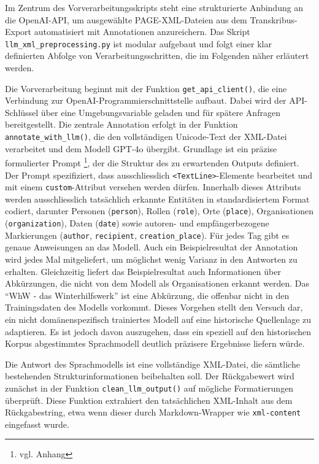 \documentclass[12pt, a4paper, ngerman, bidi=default]{article}
\newcommand{\code}[1]{\colorbox{VeryLightGray}{\texttt{#1}}} %
\begin{document}
Im Zentrum des Vorverarbeitungsskripts steht eine strukturierte Anbindung an die OpenAI-API, um ausgewählte 
PAGE-XML-Dateien aus dem Transkribus-Export automatisiert mit Annotationen anzureichern. Das Skript \code{llm\_xml\_preprocessing.py} ist modular
aufgebaut und folgt einer klar definierten Abfolge von Verarbeitungsschritten, die im Folgenden näher erläutert werden.

Die Vorverarbeitung beginnt mit der Funktion \code{get\_api\_client()}, die eine Verbindung zur OpenAI-Programmierschnittstelle 
aufbaut. Dabei wird der API-Schlüssel über eine Umgebungsvariable geladen und für spätere Anfragen bereitgestellt.
Die zentrale Annotation erfolgt in der Funktion \code{annotate\_with\_llm()}, die den vollständigen Unicode-Text der XML-Datei
verarbeitet und dem Modell GPT-4o übergibt. Grundlage ist ein präzise formulierter Prompt \footnote{vgl. Anhang }, der die Struktur des zu erwartenden
Outputs definiert. Der Prompt spezifiziert, dass ausschliesslich \code{<TextLine>}-Elemente bearbeitet und mit einem \code{custom}-Attribut
versehen werden dürfen. Innerhalb dieses Attributs werden ausschliesslich tatsächlich erkannte Entitäten in standardisiertem Format codiert, 
darunter Personen (\code{person}), Rollen (\code{role}), Orte (\code{place}), Organisationen (\code{organization}), Daten (\code{date}) 
sowie autoren- und empfängerbezogene Markierungen (\code{author}, \code{recipient}, \code{creation\_place}). Für jedes Tag gibt es genaue Anweisungen
an das Modell. Auch ein Beispielresultat der Annotation wird jedes Mal mitgeliefert, um möglichst wenig Varianz in den Antworten zu erhalten. Gleichzeitig liefert
das Beispielresultat auch Informationen über Abkürzungen, die nicht von dem Modell als Organisationen erkannt werden. Das \enquote{WhW - das Winterhilfswerk} ist eine
Abkürzung, die offenbar nicht in den Trainingsdaten des Modells vorkommt. Dieses Vorgehen stellt den Versuch dar, ein nicht domänenspezifisch trainiertes Modell 
auf eine historische Quellenlage zu adaptieren. Es ist jedoch davon auszugehen, dass ein speziell auf den historischen Korpus abgestimmtes Sprachmodell 
deutlich präzisere Ergebnisse liefern würde.

Die Antwort des Sprachmodells ist eine vollständige XML-Datei, die sämtliche bestehenden Strukturinformationen beibehalten soll. 
Der Rückgabewert wird zunächst in der Funktion \code{clean\_llm\_output()} auf mögliche Formatierungen überprüft. Diese Funktion 
extrahiert den tatsächlichen XML-Inhalt aus dem Rückgabestring, etwa wenn dieser durch Markdown-Wrapper 
wie \code{\textasciigrave\textasciigrave\textasciigrave xml-content\textquotesingle\textquotesingle\textquotesingle} eingefasst wurde.
\end{document}
